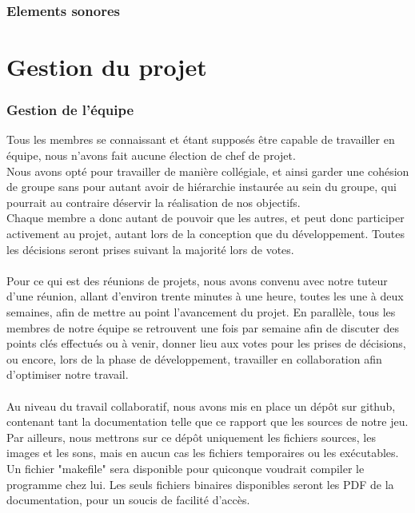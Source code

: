 \documentclass[a4paper]{article}
\newcommand{\alinea}{\hspace*{0.5cm}}
\begin{document}
    \section{Elements sonores}
    

  \newpage
  \part{Gestion du projet}
    \section{Gestion de l'équipe}
      \alinea Tous les membres se connaissant et étant supposés être capable de travailler en équipe, nous n'avons fait aucune élection de chef de projet.\\
      \alinea Nous avons opté pour travailler de manière collégiale, et ainsi garder une cohésion de groupe sans pour autant avoir de hiérarchie instaurée au sein du groupe, qui pourrait au contraire déservir la réalisation de nos objectifs.\\
      \alinea Chaque membre a donc autant de pouvoir que les autres, et peut donc participer activement au projet, autant lors de la conception que du développement. Toutes les décisions seront prises suivant la majorité lors de votes.\\\\
      \alinea Pour ce qui est des réunions de projets, nous avons convenu avec notre tuteur d'une réunion, allant d'environ trente minutes à une heure, toutes les une à deux semaines, afin de mettre au point l'avancement du projet. En parallèle, tous les membres de notre équipe se retrouvent une fois par semaine afin de discuter des points clés effectués ou à venir, donner lieu aux votes pour les prises de décisions, ou encore, lors de la phase de développement, travailler en collaboration afin d'optimiser notre travail.\\\\
      \alinea Au niveau du travail collaboratif, nous avons mis en place un dépôt sur github, contenant tant la documentation telle que ce rapport que les sources de notre jeu. Par ailleurs, nous mettrons sur ce dépôt uniquement les fichiers sources, les images et les sons, mais en aucun cas les fichiers temporaires ou les exécutables. Un fichier "makefile" sera disponible pour quiconque voudrait compiler le programme chez lui. Les seuls fichiers binaires disponibles seront les PDF de la documentation, pour un soucis de facilité d'accès.
\end{document}
